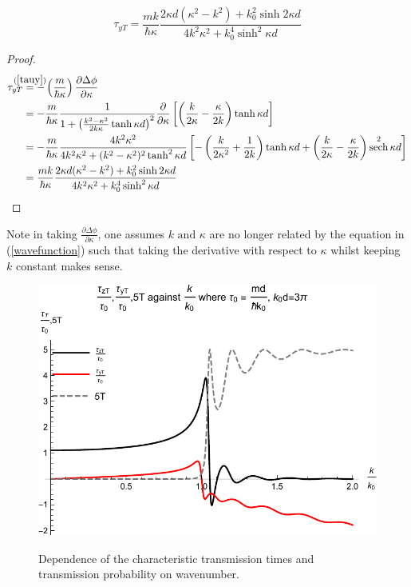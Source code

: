 \documentclass{article}
\DeclareMathOperator{\sech}{sech}
\begin{document}
\begin{equation}
	\tau_{yT} = \frac{mk}{\hbar\kappa}\frac{2\kappa d(\kappa^2-k^2)+k_0^2\sinh{2\kappa d}}{4k^2\kappa^2+k_0^4\sinh^2{\kappa d}}
\end{equation}

\begin{proof}
\begin{subequations}
\begin{align}
	\tau_{yT} &\stackrel{\mathclap{(\ref{tauy})}}{=} -\left(\frac{m}{\hbar\kappa}\right)\frac{\partial\Delta\phi}{\partial\kappa} \\
	       &=-\frac{m}{\hbar\kappa}\frac{1}{1+\left(\frac{k^2-\kappa^2}{2k\kappa}\tanh{\kappa d}\right)^2} \frac{\partial}{\partial\kappa}\left[\left(\frac{k}{2\kappa}-\frac{\kappa}{2k}\right)\tanh{\kappa d}\right] \\
	       &=-\frac{m}{\hbar\kappa}\frac{4k^2\kappa^2}{4k^2\kappa^2+(k^2-\kappa^2)^2\tanh^2{\kappa d}}\left[-\left(\frac{k}{2\kappa^2}+\frac{1}{2k}\right)\tanh{\kappa d}+\left(\frac{k}{2\kappa}-\frac{\kappa}{2k}\right)\sech^2{\kappa d}\right] \\
	       &=\frac{mk}{\hbar\kappa}\frac{2\kappa d(\kappa^2-k^2)+k_0^2\sinh{2\kappa d}}{4k^2\kappa^2+k_0^4\sinh^2{\kappa d}}
\end{align}
\end{subequations}
\end{proof}

\noindent Note in taking $\frac{\partial\Delta\phi}{\partial\kappa}$, one assumes $k \text{ and } \kappa $ are no longer related by the equation in (\ref{wavefunction}) such that taking the derivative with respect to $\kappa$ whilst keeping $k$ constant makes sense.

\begin{figure}[ht]
\centering
\includegraphics{plot3.pdf}
\label{fig:tzvst0}
\caption{Dependence of the characteristic transmission times and transmission probability on wavenumber.}
\end{figure}
\end{document}
